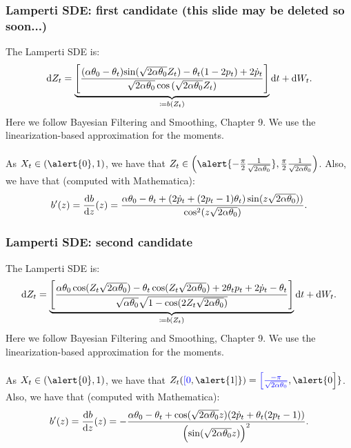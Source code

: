 \documentclass[aspectratio=169]{beamer}\usepackage[utf8]{inputenc}
\begin{document}
\begin{frame}\frametitle{Lamperti SDE: {\color{blue} first candidate} (this slide may be deleted so soon...)}

The Lamperti SDE is:
\begin{align*}
\dif Z_t= \underbrace{\left[  \frac{(\alpha \theta_0 - \theta_t) {\color{black}\sin(\sqrt{2 \alpha \theta_0 } Z_t) }- \theta_t (1 - 2 p_t) + 2  \dot{p}_t }{\sqrt{2 \alpha \theta_0} \cos{(\sqrt{2 \alpha \theta_0} Z_t)}}  \right]}_{\coloneqq b(Z_t)} \dif t + \dif W_t . 
\end{align*}
Here we follow Bayesian Filtering and Smoothing, Chapter 9. We use the linearization-based approximation for the moments.\\
\quad\\
As $X_t\in(\alert{0},1)$, we have that $Z_t\in\left(\alert{-\frac{\pi}{2}\frac{1}{\sqrt{2\alpha\theta_0}}},\frac{\pi}{2}\frac{1}{\sqrt{2\alpha\theta_0}}\right)$.
{
Also, we have that (computed with Mathematica):
\begin{equation*}
b'(z)=\frac{\dif b}{\dif z}(z)=\frac{\alpha\theta_0-\theta_t+(2\dot{p}_t+(2p_t-1)\theta_t)\sin(z\sqrt{2\alpha\theta_0}))}{\cos^2(z\sqrt{2\alpha\theta_0})}.
\end{equation*}}


\end{frame}


\begin{frame}\frametitle{Lamperti SDE: {\color{red} second candidate}}

The Lamperti SDE is:
\begin{align*}
\dif Z_t= \underbrace{\left[\frac{\alpha\theta_0\cos(Z_t\sqrt{2\alpha\theta_0})-\theta_t\cos(Z_t\sqrt{2\alpha\theta_0})+2\theta_tp_t+2\dot{p}_t-\theta_t}{\sqrt{\alpha\theta_0}\sqrt{1-\cos(2Z_t\sqrt{2\alpha\theta_0})}}\right]}_{\coloneqq b(Z_t)} \dif t + \dif W_t . 
\end{align*}
Here we follow Bayesian Filtering and Smoothing, Chapter 9. We use the linearization-based approximation for the moments.\\
\quad\\
As $X_t\in(\alert{0},1)$, we have that $Z_t({\color{blue}[0},\alert{1]})={\color{blue}\Big[\frac{-\pi}{\sqrt{2\alpha\theta_0}}},\alert{0\Big]}$.
{
Also, we have that (computed with Mathematica):
\begin{equation*}
b'(z)=\frac{\dif b}{\dif z}(z)=-\frac{\alpha\theta_0-\theta_t+\cos(\sqrt{2\alpha\theta_0}z)(2\dot{p}_t+\theta_t(2p_t-1))}{\left(\sin(\sqrt{2\alpha\theta_0}z)\right)^2}.
\end{equation*}}

\end{frame}
\end{document}
